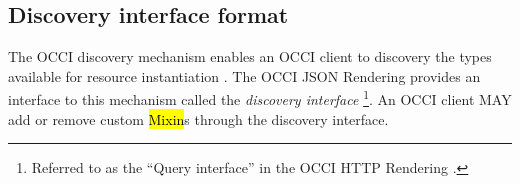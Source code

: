 \documentclass[10pt,a4paper]{article}
\begin{document}
%
%

\subsection{Discovery interface format}
\label{sec:format_discovery}

The OCCI discovery mechanism enables an OCCI client to discovery the types
available for resource instantiation \cite{occi:core}.
%
The OCCI JSON Rendering provides an interface to this mechanism called the {\em
discovery interface}%
\footnote{Referred to as the ``Query interface'' in the OCCI HTTP Rendering
\cite{occi:http_rendering}.}.
%
An OCCI client MAY add or remove custom \hl{Mixin}s through the discovery
interface.
\end{document}
